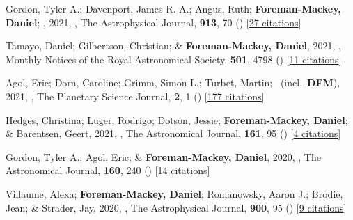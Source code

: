 \item[{\color{numcolor}\scriptsize64}] Gordon, Tyler A.; Davenport, James R. A.; Angus, Ruth; \textbf{Foreman-Mackey, Daniel}; \etal, 2021, , The Astrophysical Journal, \textbf{913}, 70 () [\href{https://ui.adsabs.harvard.edu/abs/2021ApJ...913...70G}{27 citations}]

\item[{\color{numcolor}\scriptsize63}] Tamayo, Daniel; Gilbertson, Christian; \& \textbf{Foreman-Mackey, Daniel}, 2021, , Monthly Notices of the Royal Astronomical Society, \textbf{501}, 4798 () [\href{https://ui.adsabs.harvard.edu/abs/2021MNRAS.501.4798T}{11 citations}]

\item[{\color{numcolor}\scriptsize62}] Agol, Eric; Dorn, Caroline; Grimm, Simon L.; Turbet, Martin; \etal\ (incl.\ \textbf{DFM}), 2021, , The Planetary Science Journal, \textbf{2}, 1 () [\href{https://ui.adsabs.harvard.edu/abs/2021PSJ.....2....1A}{177 citations}]

\item[{\color{numcolor}\scriptsize61}] Hedges, Christina; Luger, Rodrigo; Dotson, Jessie; \textbf{Foreman-Mackey, Daniel}; \& Barentsen, Geert, 2021, , The Astronomical Journal, \textbf{161}, 95 () [\href{https://ui.adsabs.harvard.edu/abs/2021AJ....161...95H}{4 citations}]

\item[{\color{numcolor}\scriptsize60}] Gordon, Tyler A.; Agol, Eric; \& \textbf{Foreman-Mackey, Daniel}, 2020, , The Astronomical Journal, \textbf{160}, 240 () [\href{https://ui.adsabs.harvard.edu/abs/2020AJ....160..240G}{14 citations}]

\item[{\color{numcolor}\scriptsize59}] Villaume, Alexa; \textbf{Foreman-Mackey, Daniel}; Romanowsky, Aaron J.; Brodie, Jean; \& Strader, Jay, 2020, , The Astrophysical Journal, \textbf{900}, 95 () [\href{https://ui.adsabs.harvard.edu/abs/2020ApJ...900...95V}{9 citations}]

